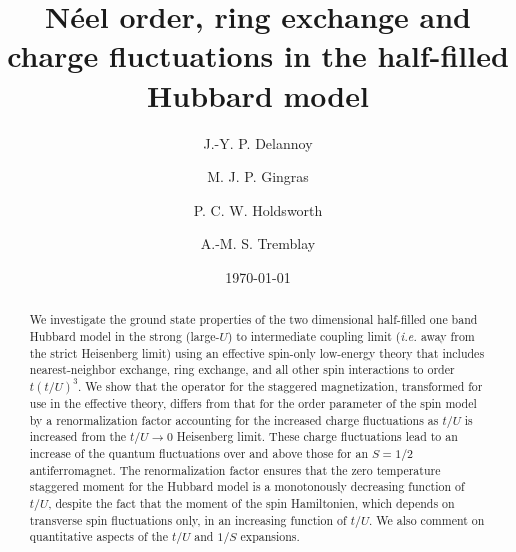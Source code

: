\documentclass[aps,prb,twocolumn,superscriptaddress,
               amsmath]{revtex4}
\renewcommand{\=}{\,=\,}
\newcommand{\+}{\,+\,}
\renewcommand{\-}{\,-\,}
\begin{document}
\title{\textbf{N\'eel order, ring exchange and
charge fluctuations in the half-filled Hubbard model}}




\author{J.-Y. P. Delannoy}




\author{M. J. P. Gingras}


\author{P. C. W. Holdsworth}






\author{A.-M. S. Tremblay}






\date{\today}


\begin{abstract}  We  investigate the ground state properties of the two
dimensional half-filled one band Hubbard model in the strong (large-$U$)
to intermediate coupling limit ({\it i.e.} away from the strict Heisenberg limit)
using an effective spin-only low-energy
theory  that includes nearest-neighbor exchange, ring exchange, and all
other  spin  interactions to order $t(t/U)^3$. We show that the operator
for  the  staggered  magnetization, transformed for use in the effective
theory, differs from that for the order parameter of the spin model by a renormalization  factor  accounting  for  the  increased  charge
fluctuations as $t/U$ is increased from the $t/U\rightarrow0$ Heisenberg limit.
These charge fluctuations lead
to an increase of the
quantum fluctuations over and
above   those   for   an   $S=1/2$   antiferromagnet.
The renormalization factor
ensures that the zero temperature staggered moment for the Hubbard model
is  a  monotonously
decreasing function of $t/U$, despite the fact that the moment of the spin Hamiltonien, which depends on transverse spin fluctuations only, in an increasing function of $t/U$. We also comment on quantitative aspects of the $t/U$ and $1/S$ expansions.



\end{abstract}
\end{document}
